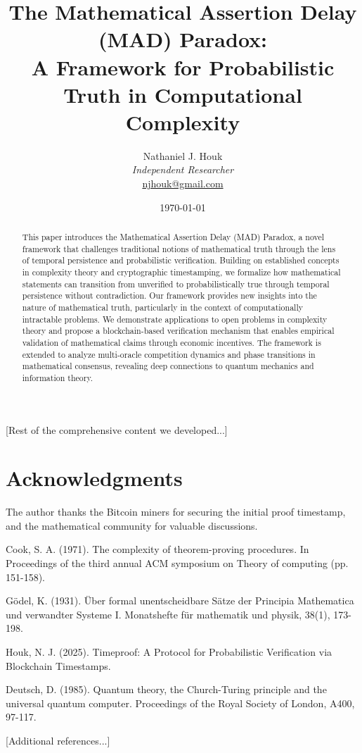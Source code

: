 \documentclass[12pt]{article}
\title{The Mathematical Assertion Delay (MAD) Paradox: \\
A Framework for Probabilistic Truth in Computational Complexity}
\author{Nathaniel J. Houk\\
\textit{Independent Researcher}\\
\href{mailto:njhouk@gmail.com}{njhouk@gmail.com}}
\date{\today}
\begin{document}
\maketitle

\begin{abstract}
This paper introduces the Mathematical Assertion Delay (MAD) Paradox, a novel framework that challenges traditional notions of mathematical truth through the lens of temporal persistence and probabilistic verification. Building on established concepts in complexity theory and cryptographic timestamping, we formalize how mathematical statements can transition from unverified to probabilistically true through temporal persistence without contradiction. Our framework provides new insights into the nature of mathematical truth, particularly in the context of computationally intractable problems. We demonstrate applications to open problems in complexity theory and propose a blockchain-based verification mechanism that enables empirical validation of mathematical claims through economic incentives. The framework is extended to analyze multi-oracle competition dynamics and phase transitions in mathematical consensus, revealing deep connections to quantum mechanics and information theory.
\end{abstract}

[Rest of the comprehensive content we developed...]

\section*{Acknowledgments}
The author thanks the Bitcoin miners for securing the initial proof timestamp, and the mathematical community for valuable discussions.

\begin{thebibliography}{99}
 Cook, S. A. (1971). The complexity of theorem-proving procedures. In Proceedings of the third annual ACM symposium on Theory of computing (pp. 151-158).

 Gödel, K. (1931). Über formal unentscheidbare Sätze der Principia Mathematica und verwandter Systeme I. Monatshefte für mathematik und physik, 38(1), 173-198.

 Houk, N. J. (2025). Timeproof: A Protocol for Probabilistic Verification via Blockchain Timestamps.

 Deutsch, D. (1985). Quantum theory, the Church-Turing principle and the universal quantum computer. Proceedings of the Royal Society of London, A400, 97-117.

[Additional references...]

\end{thebibliography}
\end{document}
